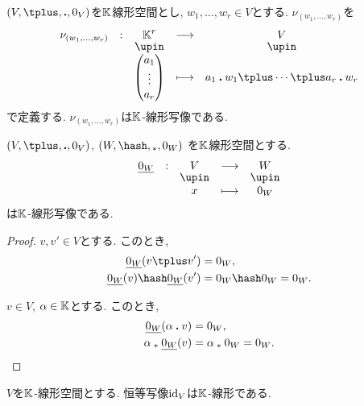 \begin{example}
  $(V,\plus,\act,0_V)$を$\mathbb{K}$線形空間とし,
  $w_1,\ldots,w_r\in V$とする.
  $\nu_{(w_1,\ldots,w_r)}$を
    \begin{align*}
      \shazo{\nu_{(w_1,\ldots,w_r)}}{\KK^r}{V}
      {\begin{pmatrix}a_1\\\vdots\\a_r\end{pmatrix}}{a_1\act w_1\plus\cdots\plus a_r\act w_r}
    \end{align*}
    で定義する.
  $\nu_{(w_1,\ldots,w_r)}$は$\mathbb{K}$-線形写像である.
\end{example}

\begin{example}
\label{prop:zeromapislinear}
  $(V,\plus,\act,0_V)$,
  $(W,\pplus,\aact,0_W)$
  を$\mathbb{K}$線形空間とする.
    \begin{align*}
      \shazo{\underline{0_W}}{V}{W}
      {x}{0_W}
    \end{align*}
  は$\mathbb{K}$-線形写像である.
\end{example}
\begin{proof}
$v,v'\in V$とする.
このとき,
\begin{align*}
\underline{0_W}(v\plus v')&=0_W,\\
\underline{0_W}(v)\pplus \underline{0_W}(v')&=0_W\pplus 0_W=0_W.\\
\end{align*}

$v\in V$, $\alpha\in\mathbb{K}$とする.
このとき,
\begin{align*}
\underline{0_W}(\alpha\mathbin{\boldsymbol{.}} v)&=0_W,\\
\alpha\mathbin{{}_\ast} \underline{0_W}(v)&=\alpha\mathbin{{}_\ast} 0_W=0_W.\\
\end{align*}
\end{proof}

\begin{example}
  $V$を$\mathbb{K}$-線形空間とする.
  恒等写像$\operatorname{id}_V$は$\mathbb{K}$-線形である.
\end{example}




